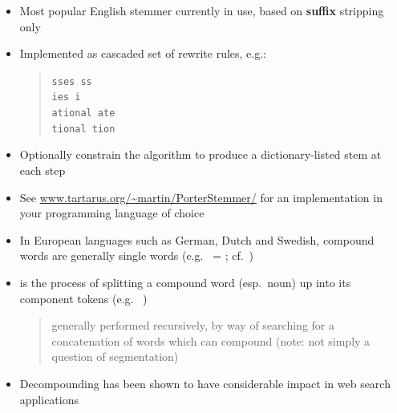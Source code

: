 \documentclass[a4paper,landscape,headrule,footrule,xetex]{foils}
\begin{document}

\begin{itemize}
\item Most popular English stemmer currently in use, based on
  \textbf{suffix} stripping only
\item Implemented as cascaded set of rewrite rules, e.g.:
  \begin{quote}
    \texttt{sses \infers ss}\\
    \texttt{ies \infers i}\\
    \texttt{ational \infers  ate}\\
    \texttt{tional \infers  tion}
  \end{quote}
\item Optionally constrain the algorithm to produce a dictionary-listed
  stem at each step
\item See \url{www.tartarus.org/~martin/PorterStemmer/} for
  an implementation in your programming language of choice
\end{itemize}












\MyLogo{}

\begin{itemize}
\item In European languages such as German, Dutch and Swedish, compound
  words are generally single words (e.g.\  =
  ; cf.\ )
\item {} is the process of splitting a compound word
  (esp.\ noun) up into its component tokens (e.g.\ 
  \infers {})
  \begin{quote}
    generally performed recursively, by way of searching for a
    concatenation of words which can compound (note: not simply a
    question of segmentation)
  \end{quote}
\item Decompounding has been shown to have considerable impact in web
  search applications
\end{itemize}
\end{document}
